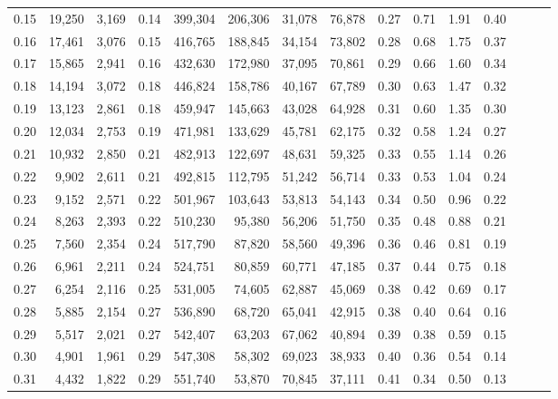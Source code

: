 \begin{tabular}{rrrrrrrrrrrrrrr}
0.15 &  19,250 &  3,169 &  0.14 &  399,304 &  206,306 &   31,078 &   76,878 &  0.27 &  0.71 &  1.91 &      0.40 \\
0.16 &  17,461 &  3,076 &  0.15 &  416,765 &  188,845 &   34,154 &   73,802 &  0.28 &  0.68 &  1.75 &      0.37 \\
0.17 &  15,865 &  2,941 &  0.16 &  432,630 &  172,980 &   37,095 &   70,861 &  0.29 &  0.66 &  1.60 &      0.34 \\
0.18 &  14,194 &  3,072 &  0.18 &  446,824 &  158,786 &   40,167 &   67,789 &  0.30 &  0.63 &  1.47 &      0.32 \\
0.19 &  13,123 &  2,861 &  0.18 &  459,947 &  145,663 &   43,028 &   64,928 &  0.31 &  0.60 &  1.35 &      0.30 \\
0.20 &  12,034 &  2,753 &  0.19 &  471,981 &  133,629 &   45,781 &   62,175 &  0.32 &  0.58 &  1.24 &      0.27 \\
0.21 &  10,932 &  2,850 &  0.21 &  482,913 &  122,697 &   48,631 &   59,325 &  0.33 &  0.55 &  1.14 &      0.26 \\
0.22 &   9,902 &  2,611 &  0.21 &  492,815 &  112,795 &   51,242 &   56,714 &  0.33 &  0.53 &  1.04 &      0.24 \\
0.23 &   9,152 &  2,571 &  0.22 &  501,967 &  103,643 &   53,813 &   54,143 &  0.34 &  0.50 &  0.96 &      0.22 \\
0.24 &   8,263 &  2,393 &  0.22 &  510,230 &   95,380 &   56,206 &   51,750 &  0.35 &  0.48 &  0.88 &      0.21 \\
0.25 &   7,560 &  2,354 &  0.24 &  517,790 &   87,820 &   58,560 &   49,396 &  0.36 &  0.46 &  0.81 &      0.19 \\
0.26 &   6,961 &  2,211 &  0.24 &  524,751 &   80,859 &   60,771 &   47,185 &  0.37 &  0.44 &  0.75 &      0.18 \\
0.27 &   6,254 &  2,116 &  0.25 &  531,005 &   74,605 &   62,887 &   45,069 &  0.38 &  0.42 &  0.69 &      0.17 \\
0.28 &   5,885 &  2,154 &  0.27 &  536,890 &   68,720 &   65,041 &   42,915 &  0.38 &  0.40 &  0.64 &      0.16 \\
0.29 &   5,517 &  2,021 &  0.27 &  542,407 &   63,203 &   67,062 &   40,894 &  0.39 &  0.38 &  0.59 &      0.15 \\
0.30 &   4,901 &  1,961 &  0.29 &  547,308 &   58,302 &   69,023 &   38,933 &  0.40 &  0.36 &  0.54 &      0.14 \\
0.31 &   4,432 &  1,822 &  0.29 &  551,740 &   53,870 &   70,845 &   37,111 &  0.41 &  0.34 &  0.50 &      0.13 \\

\end{tabular}
